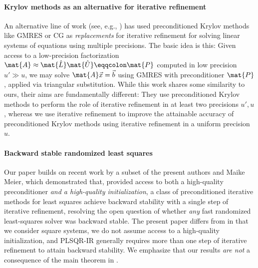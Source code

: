 \paragraph{Krylov methods as an alternative for iterative refinement}
An alternative line of work (see, e.g., \cite{amestoy2024five,carson2018accelerating,HP21,CH17}) has used preconditioned Krylov methods like GMRES or CG as \emph{replacements} for iterative refinement for solving linear systems of equations using multiple precisions.
The basic idea is this:
Given access to a low-precision \LU factorization $\mat{A} \approx \mat{\hat{L}}\mat{\hat{U}} \eqqcolon \mat{P}$ computed in low precision $u' \gg u$, we may solve $\mat{A}\vec{x} = \vec{b}$ using GMRES with preconditioner $\mat{P}$, applied via triangular substitution.
While this work shares some similarity to ours, their aims are fundamentally different: They use preconditioned Krylov methods to perform the role of iterative refinement in at least two precisions $u', u$, whereas we use iterative refinement to improve the attainable accuracy of preconditioned Krylov methods using iterative refinement in a uniform precision $u$.

\paragraph{Backward stable randomized least squares}
Our paper builds on recent work \cite{EMN24} by a subset of the present authors and Maike Meier, which demonstrated that, provided access to both a high-quality preconditioner \emph{and a high-quality initialization}, a class of preconditioned iterative methods for least squares achieve backward stability with a single step of iterative refinement, resolving the open question \cite{Epp24a,MNTW24} of whether \emph{any} fast randomized least-squares solver was backward stable.
The present paper differs from \cite{EMN24} in that we consider square systems, we do not assume access to a high-quality initialization, and PLSQR-IR generally requires more than one step of iterative refinement to attain backward stability.
We emphasize that our results \emph{are not} a consequence of the main theorem in \cite{EMN24}.